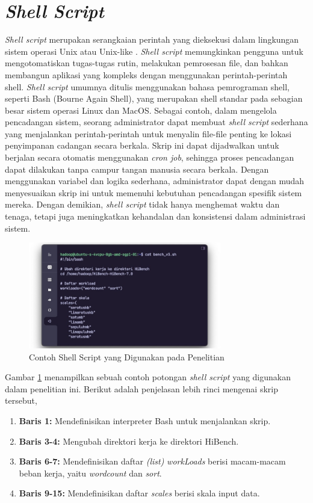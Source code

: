 \section{\textit{Shell Script}}
\textit{Shell script} merupakan serangkaian perintah yang dieksekusi dalam lingkungan sistem operasi Unix atau Unix-like \cite{newhamLearningBashShell2005}. \textit{Shell script} memungkinkan pengguna untuk mengotomatiskan tugas-tugas rutin, melakukan pemrosesan file, dan bahkan membangun aplikasi yang kompleks dengan menggunakan perintah-perintah shell. \textit{Shell script} umumnya ditulis menggunakan bahasa pemrograman shell, seperti Bash (Bourne Again Shell), yang merupakan shell standar pada sebagian besar sistem operasi Linux dan MacOS.
Sebagai contoh, dalam mengelola pencadangan sistem, seorang administrator dapat membuat \textit{shell script} sederhana yang menjalankan perintah-perintah untuk menyalin file-file penting ke lokasi penyimpanan cadangan secara berkala. Skrip ini dapat dijadwalkan untuk berjalan secara otomatis menggunakan \textit{cron job}, sehingga proses pencadangan dapat dilakukan tanpa campur tangan manusia secara berkala. Dengan menggunakan variabel dan logika sederhana, administrator dapat dengan mudah menyesuaikan skrip ini untuk memenuhi kebutuhan pencadangan spesifik sistem mereka. Dengan demikian, \textit{shell script} tidak hanya menghemat waktu dan tenaga, tetapi juga meningkatkan kehandalan dan konsistensi dalam administrasi sistem.

\begin{figure}[h]
    \centering
    \includegraphics[width=0.75\textwidth]{figures/ch02/contoh-bash}
    \caption{Contoh Shell Script yang Digunakan pada Penelitian}
    \label{fig:contoh-bash}
\end{figure}

\newpage
Gambar \ref{fig:contoh-bash} menampilkan sebuah contoh potongan \textit{shell script} yang digunakan dalam penelitian ini. Berikut adalah penjelasan lebih rinci mengenai skrip tersebut,
\begin{enumerate}
    \item \textbf{Baris 1:} Mendefinisikan interpreter Bash untuk menjalankan skrip.
    \item \textbf{Baris 3-4: } Mengubah direktori kerja ke direktori HiBench.
    \item \textbf{Baris 6-7: } Mendefinisikan daftar \textit{(list)} \textit{workLoads} berisi macam-macam beban kerja, yaitu \textit{wordcount} dan \textit{sort}.
    \item \textbf{Baris 9-15: } Mendefinisikan daftar \textit{scales} berisi skala input data.
\end{enumerate}

